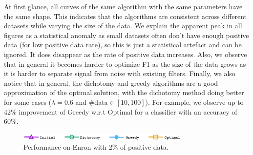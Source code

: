 At first glance, all curves of the same algorithm with the same parameters have the same shape. This indicates that the algorithms are consistent across different datasets while varying the size of the data. We explain the apparent peak in all figures as a statistical anomaly as small datasets often don't have enough positive data (for low positive data rate), so this is just a statistical artefact  and can be ignored.  It does disappear as the rate of positive data increases. %
Also, we observe that in general it becomes harder to optimize F1 as the size of the data grows as it is harder to separate signal from noise with existing filters. Finally, we also notice that in general, the dichotomy and greedy algorithms are a good approximation of the optimal solution, with the dichotomy method doing better for some cases ($\lambda=0.6$ and \#data$\in [10,100]$). For example,  we observe up to 42\% improvement of Greedy w.r.t Optimal for a classifier with an accuracy of 60\%.





\begin{figure}[H]
\begin{centering}
\includegraphics[width=8.5cm]{imgs/legend1}
\par\end{centering}
\begin{centering}
\par\end{centering}
\caption{Performance on  Enron  with 2\% of positive data.}
\label{fig:F1_vs_Data_Enron}
\end{figure}


